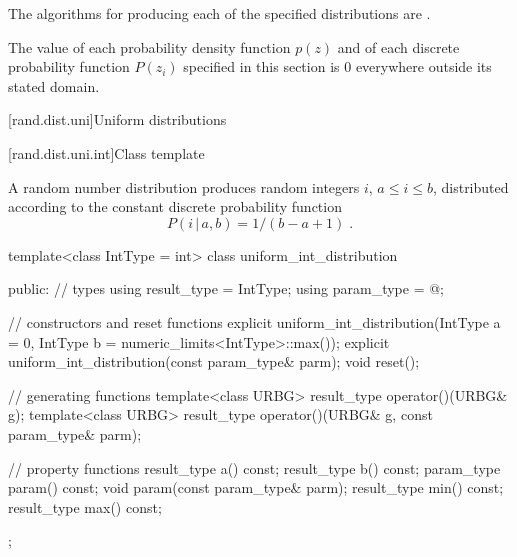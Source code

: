 \pnum
The algorithms for producing each
of the specified distributions are
.

\pnum
The value of each probability density function $p(z)$
and of each discrete probability function $P(z_i)$
specified in this section
is $0$
everywhere outside its stated domain.


[rand.dist.uni]{Uniform distributions}%
%


[rand.dist.uni.int]{Class template }%
%
%

\pnum
A  random number distribution
produces random integers $i$,
$ a \leq i \leq b $,
distributed according to
the constant discrete probability function%
%
%
\[%
 P(i\,|\,a,b) = 1 / (b - a + 1)
\; \mbox{.}
\]

%
\begin{codeblock}
template<class IntType = int>
 class uniform_int_distribution
{
public:
 // types
 using result_type = IntType;
 using param_type  = @\unspec@;

 // constructors and reset functions
 explicit uniform_int_distribution(IntType a = 0, IntType b = numeric_limits<IntType>::max());
 explicit uniform_int_distribution(const param_type& parm);
 void reset();

 // generating functions
 template<class URBG>
   result_type operator()(URBG& g);
 template<class URBG>
   result_type operator()(URBG& g, const param_type& parm);

 // property functions
 result_type a() const;
 result_type b() const;
 param_type param() const;
 void param(const param_type& parm);
 result_type min() const;
 result_type max() const;
};
\end{codeblock}


